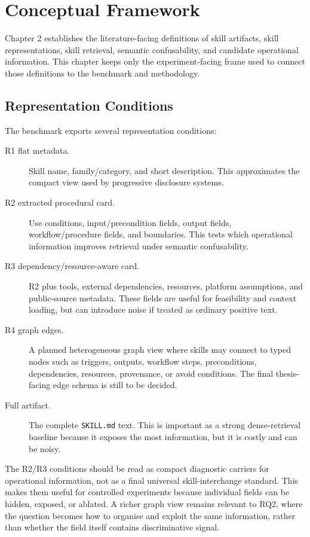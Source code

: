 \chapter{Conceptual Framework}

Chapter 2 establishes the literature-facing definitions of skill artifacts, skill representations, skill retrieval, semantic confusability, and candidate operational information. This chapter keeps only the experiment-facing frame used to connect those definitions to the benchmark and methodology.

\section{Representation Conditions}

The benchmark exports several representation conditions:

\begin{description}
  \item[R1 flat metadata.] Skill name, family/category, and short description. This approximates the compact view used by progressive disclosure systems.
  \item[R2 extracted procedural card.] Use conditions, input/precondition fields, output fields, workflow/procedure fields, and boundaries. This tests which operational information improves retrieval under semantic confusability.
  \item[R3 dependency/resource-aware card.] R2 plus tools, external dependencies, resources, platform assumptions, and public-source metadata. These fields are useful for feasibility and context loading, but can introduce noise if treated as ordinary positive text.
  \item[R4 graph edges.] A planned heterogeneous graph view where skills may connect to typed nodes such as triggers, outputs, workflow steps, preconditions, dependencies, resources, provenance, or avoid conditions. The final thesis-facing edge schema is still to be decided.
  \item[Full artifact.] The complete \texttt{SKILL.md} text. This is important as a strong dense-retrieval baseline because it exposes the most information, but it is costly and can be noisy.
\end{description}

The R2/R3 conditions should be read as compact diagnostic carriers for operational information, not as a final universal skill-interchange standard. This makes them useful for controlled experiments because individual fields can be hidden, exposed, or ablated. A richer graph view remains relevant to RQ2, where the question becomes how to organise and exploit the same information, rather than whether the field itself contains discriminative signal.

